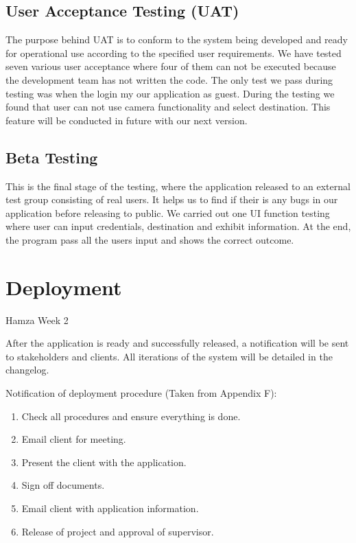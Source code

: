 \subsection{User Acceptance Testing (UAT)}
The purpose behind UAT is to conform to the system being developed and ready for operational use according to the specified user requirements. We have tested seven various user acceptance where four of them can not be executed because the development team has not written the code. The only test we pass during testing was when the login my our application as guest. During the testing we found that user can not use camera functionality and select destination. This feature will be conducted in future with our next version.

\subsection{Beta Testing}
This is the final stage of the testing, where the application released to an external test group consisting of real users. It helps us to find if their is any bugs in our application before releasing to public. We carried out one UI function testing where user can input credentials, destination and exhibit information. At the end, the program pass all the users input and shows the correct outcome.

\section{Deployment}
Hamza Week 2

After the application is ready and successfully released, a notification will be sent to stakeholders and clients. All iterations of the system will be detailed in the changelog.

Notification of deployment procedure (Taken from Appendix F):

\begin{enumerate}
	\item Check all procedures and ensure everything is done.
	\item Email client for meeting.
	\item Present the client with the application.
	\item Sign off documents.
	\item Email client with application information.
	\item Release of project and approval of supervisor.
\end{enumerate}


